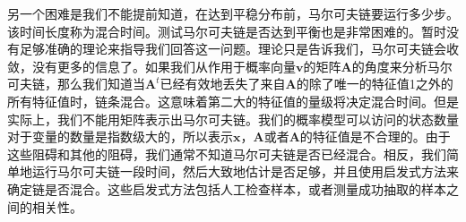 另一个困难是我们不能提前知道，在达到平稳分布前，马尔可夫链要运行多少步。该时间长度称为混合时间。测试马尔可夫链是否达到平衡也是非常困难的。暂时没有足够准确的理论来指导我们回答这一问题。理论只是告诉我们，马尔可夫链会收敛，没有更多的信息了。如果我们从作用于概率向量\(\bm{v}\)的矩阵\(\bm{A}\)的角度来分析马尔可夫链，那么我们知道当\({ \bm{A} }^{ t }\)已经有效地丢失了来自\(\bm{A}\)的除了唯一的特征值1之外的所有特征值时，链条混合。这意味着第二大的特征值的量级将决定混合时间。但是实际上，我们不能用矩阵表示出马尔可夫链。我们的概率模型可以访问的状态数量对于变量的数量是指数级大的，所以表示\(\bm{x}\)，\(\bm{A}\)或者\(\bm{A}\)的特征值是不合理的。由于这些阻碍和其他的阻碍，我们通常不知道马尔可夫链是否已经混合。相反，我们简单地运行马尔可夫链一段时间，然后大致地估计是否足够，并且使用启发式方法来确定链是否混合。这些启发式方法包括人工检查样本，或者测量成功抽取的样本之间的相关性。
